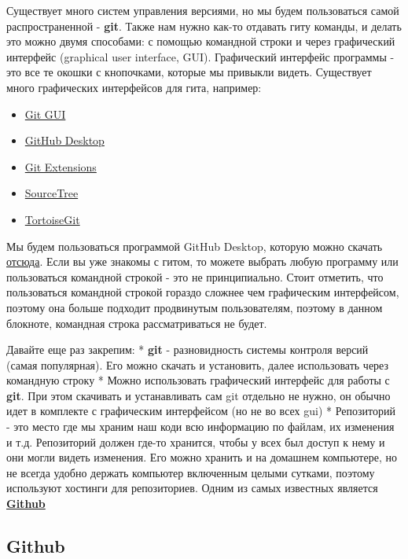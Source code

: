 \documentclass[11pt]{article}
\providecommand{\tightlist}{%
      \setlength{\itemsep}{0pt}\setlength{\parskip}{0pt}}
\begin{document}
Существует много систем управления версиями, но мы будем пользоваться
самой распространенной - \textbf{git}. Также нам нужно как-то отдавать
гиту команды, и делать это можно двумя способами: с помощью командной
строки и через графический интерфейс (graphical user interface, GUI).
Графический интерфейс программы - это все те окошки с кнопочками,
которые мы привыкли видеть. Существует много графических интерфейсов для
гита, например:

\begin{itemize}
\tightlist
\item
  \href{https://git-scm.com/docs/git-gui}{Git GUI}
\item
  \href{https://desktop.github.com/}{GitHub Desktop}
\item
  \href{https://gitextensions.github.io/}{Git Extensions}
\item
  \href{https://www.sourcetreeapp.com/}{SourceTree}
\item
  \href{https://tortoisegit.org/}{TortoiseGit}
\end{itemize}

Мы будем пользоваться программой GitHub Desktop, которую можно скачать
\href{https://desktop.github.com/}{отсюда}. Если вы уже знакомы с гитом,
то можете выбрать любую программу или пользоваться командной строкой -
это не принципиально. Стоит отметить, что пользоваться командной строкой
гораздо сложнее чем графическим интерфейсом, поэтому она больше подходит
продвинутым пользователям, поэтому в данном блокноте, командная строка
рассматриваться не будет.

Давайте еще раз закрепим: * \textbf{git} - разновидность системы
контроля версий (самая популярная). Его можно скачать и установить,
далее использовать через командную строку * Можно использовать
графический интерфейс для работы с \textbf{git}. При этом скачивать и
устанавливать сам git отдельно не нужно, он обычно идет в комплекте с
графическим интерфейсом (но не во всех gui) * Репозиторий - это место
где мы храним наш код и всю информацию по файлам, их изменения и
т.д. Репозиторий должен где-то хранится, чтобы у всех был доступ к нему
и они могли видеть изменения. Его можно хранить и на домашнем
компьютере, но не всегда удобно держать компьютер включенным целыми
сутками, поэтому используют хостинги для репозиториев. Одним из самых
известных является \textbf{\href{github.com}{Github}}

    \subsection{Github}\label{github}
\end{document}
